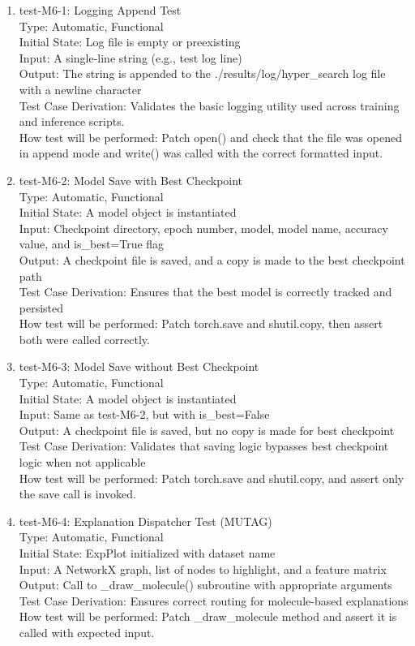 \documentclass[12pt, titlepage]{article}
\begin{document}
\begin{enumerate}

\item{test-M6-1: Logging Append Test\\}
Type: Automatic, Functional \\
Initial State: Log file is empty or preexisting \\
Input: A single-line string (e.g., test log line) \\
Output: The string is appended to the ./results/log/hyper\_search log file with a newline character \\
Test Case Derivation: Validates the basic logging utility used across training and inference scripts. \\
How test will be performed: Patch open() and check that the file was opened in append mode and write() was called with the correct formatted input.

\item{test-M6-2: Model Save with Best Checkpoint\\}
Type: Automatic, Functional \\
Initial State: A model object is instantiated \\
Input: Checkpoint directory, epoch number, model, model name, accuracy value, and is\_best=True flag \\
Output: A checkpoint file is saved, and a copy is made to the best checkpoint path \\
Test Case Derivation: Ensures that the best model is correctly tracked and persisted \\
How test will be performed: Patch torch.save and shutil.copy, then assert both were called correctly.

\item{test-M6-3: Model Save without Best Checkpoint\\}
Type: Automatic, Functional \\
Initial State: A model object is instantiated \\
Input: Same as test-M6-2, but with is\_best=False \\
Output: A checkpoint file is saved, but no copy is made for best checkpoint \\
Test Case Derivation: Validates that saving logic bypasses best checkpoint logic when not applicable \\
How test will be performed: Patch torch.save and shutil.copy, and assert only the save call is invoked.

\item{test-M6-4: Explanation Dispatcher Test (MUTAG)\\}
Type: Automatic, Functional \\
Initial State: ExpPlot initialized with dataset name \\
Input: A NetworkX graph, list of nodes to highlight, and a feature matrix \\
Output: Call to \_draw\_molecule() subroutine with appropriate arguments \\
Test Case Derivation: Ensures correct routing for molecule-based explanations \\
How test will be performed: Patch \_draw\_molecule method and assert it is called with expected input.


\end{enumerate}
\end{document}
